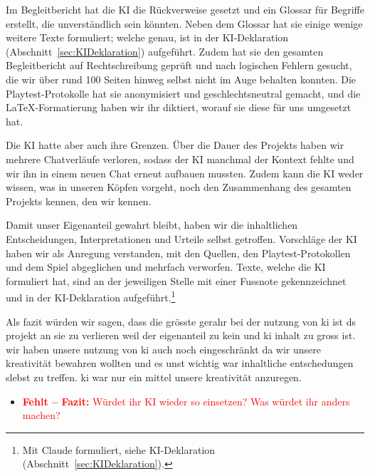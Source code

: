 \documentclass[../Main.tex]{subfiles}
\begin{document}
Im Begleitbericht hat die KI die Rückverweise gesetzt und ein Glossar für Begriffe erstellt, die unverständlich sein könnten. Neben dem Glossar hat sie einige wenige weitere Texte formuliert; welche genau, ist in der KI-Deklaration (Abschnitt~\ref{sec:KIDeklaration}) aufgeführt. Zudem hat sie den gesamten Begleitbericht auf Rechtschreibung geprüft und nach logischen Fehlern gesucht, die wir über rund 100 Seiten hinweg selbst nicht im Auge behalten konnten. Die Playtest-Protokolle hat sie anonymisiert und geschlechtsneutral gemacht, und die \LaTeX-Formatierung haben wir ihr diktiert, worauf sie diese für uns umgesetzt hat.

Die KI hatte aber auch ihre Grenzen. Über die Dauer des Projekts haben wir mehrere Chatverläufe verloren, sodass der KI manchmal der Kontext fehlte und wir ihn in einem neuen Chat erneut aufbauen mussten. Zudem kann die KI weder wissen, was in unseren Köpfen vorgeht, noch den Zusammenhang des gesamten Projekts kennen, den wir kennen.

Damit unser Eigenanteil gewahrt bleibt, haben wir die inhaltlichen Entscheidungen, Interpretationen und Urteile selbst getroffen. Vorschläge der KI haben wir als Anregung verstanden, mit den Quellen, den Playtest-Protokollen und dem Spiel abgeglichen und mehrfach verworfen. Texte, welche die KI formuliert hat, sind an der jeweiligen Stelle mit einer Fussnote gekennzeichnet und in der KI-Deklaration aufgeführt.\footnote{Mit Claude formuliert, siehe KI-Deklaration (Abschnitt~\ref{sec:KIDeklaration}).}

Als fazit würden wir sagen, dass die grösste gerahr bei der nutzung von ki ist ds projekt an sie zu verlieren weil der eigenanteil zu kein und ki inhalt zu gross ist. wir haben unsere nutzung von ki auch noch eingeschränkt da wir unsere kreativität bewahren wollten und es unst wichtig war inhaltliche entschedungen slebst zu treffen. ki war nur ein mittel unsere kreativität anzuregen.

\begin{itemize}[leftmargin=1.5cm]
    \item \textcolor{red}{\textbf{Fehlt -- Fazit:} Würdet ihr KI wieder so einsetzen? Was würdet ihr anders machen?}
\end{itemize}
\end{document}
